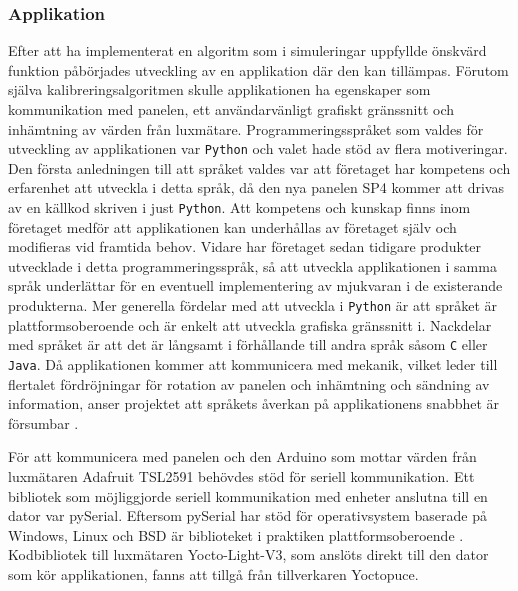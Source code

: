 
        \subsubsection{Applikation} %
        \label{ssub:utveckling_av_applikation}
            Efter att ha implementerat en algoritm som i simuleringar uppfyllde önskvärd funktion påbörjades utveckling av en applikation där den kan tillämpas. Förutom själva kalibreringsalgoritmen skulle applikationen ha egenskaper som kommunikation med panelen, ett användarvänligt grafiskt gränssnitt och inhämtning av värden från luxmätare. Programmeringsspråket som valdes för utveckling av applikationen var \texttt{Python} och valet hade stöd av flera motiveringar. Den första anledningen till att språket valdes var att företaget har kompetens och erfarenhet att utveckla i detta språk, då den nya panelen SP4 kommer att drivas av en källkod skriven i just \texttt{Python}. Att kompetens och kunskap finns inom företaget medför att applikationen kan underhållas av företaget själv och modifieras vid framtida behov. Vidare har företaget sedan tidigare produkter utvecklade i detta programmeringsspråk, så att utveckla applikationen i samma språk underlättar för en eventuell implementering av mjukvaran i de existerande produkterna. Mer generella fördelar med att utveckla i \texttt{Python} är att språket är plattformsoberoende och är enkelt att utveckla grafiska gränssnitt i. Nackdelar med språket är att det är långsamt i förhållande till andra språk såsom \texttt{C} eller \texttt{Java}. Då applikationen kommer att kommunicera med mekanik, vilket leder till flertalet fördröjningar för rotation av panelen och inhämtning och sändning av information, anser projektet att språkets åverkan på applikationens snabbhet är försumbar \cite{python_speed}. \bigskip

            För att kommunicera med panelen och den Arduino som mottar värden från luxmätaren Adafruit TSL2591 behövdes stöd för seriell kommunikation. Ett bibliotek som möjliggjorde seriell kommunikation med enheter anslutna till en dator var pySerial. Eftersom pySerial har stöd för operativsystem baserade på Windows, Linux och BSD är biblioteket i praktiken plattformsoberoende \cite{pyserial}. 
            Kodbibliotek till luxmätaren Yocto-Light-V3, som anslöts direkt till den dator som kör applikationen, fanns att tillgå från tillverkaren Yoctopuce. \bigskip

